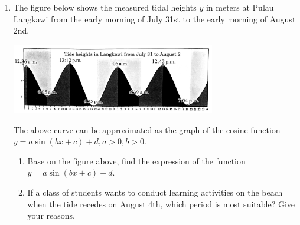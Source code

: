 \documentclass{report}
\begin{document}
\begin{enumerate}[start=4]
    \item The figure below shows the measured tidal heights \( y \) in meters at Pulau Langkawi from the early morning of July 31st to the early morning of August 2nd.
    \begin{center}
        \includegraphics[width=0.7\textwidth]{assets/9-46.jpg}
    \end{center}

    The above curve can be approximated as the graph of the cosine function \( y = a \sin (b x + c) + d, a > 0, b > 0 \).
    \begin{enumerate}[label=(\alph*)]
        \item Base on the figure above, find the expression of the function $y=a \sin (b x+c)+d$.
        \item If a class of students wants to conduct learning activities on the beach when the tide recedes on August 4th, which period is most suitable? Give your reasons.
    \end{enumerate}
\end{enumerate}
\end{document}
